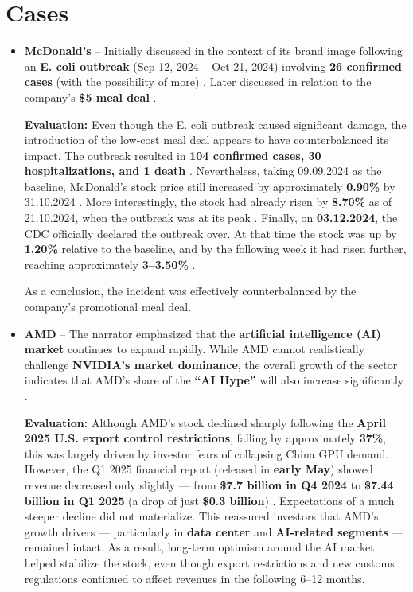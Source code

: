 \documentclass[12pt,a4paper]{article}
\begin{document}
\section{Cases}
\begin{itemize}
    \item \textbf{McDonald's} -- Initially discussed in the context of its brand image following an \textbf{E. coli outbreak} (Sep 12, 2024 – Oct 21, 2024) involving \textbf{26 confirmed cases} (with the possibility of more) \cite{wikipedia}. Later discussed in relation to the company’s \textbf{\$5 meal deal} \cite{cnbc}. 
\vspace{0.3cm}

\textbf{Evaluation:} Even though the E. coli outbreak caused significant damage, 
the introduction of the low-cost meal deal appears to have counterbalanced its impact. 
The outbreak resulted in \textbf{104 confirmed cases, 30 hospitalizations, and 1 death} \cite{wikipedia}. 
Nevertheless, taking 09.09.2024 as the baseline, McDonald’s stock price still increased by approximately \textbf{0.90\%} by 31.10.2024 \cite{yahoo}. 
More interestingly, the stock had already risen by \textbf{8.70\%} as of 21.10.2024, when the outbreak was at its peak \cite{yahoo}. 
Finally, on \textbf{03.12.2024}, the CDC officially declared the outbreak over. 
At that time the stock was up by \textbf{1.20\%} relative to the baseline, and by the following week it had risen further, reaching approximately \textbf{3--3.50\%} \cite{yahoo}.

As a conclusion, the incident was effectively counterbalanced by the company’s promotional meal deal.
\vspace{0.7cm}



    \item \textbf{AMD} -- The narrator emphasized that the \textbf{artificial intelligence (AI) market} continues to expand rapidly. 
    While AMD cannot realistically challenge \textbf{NVIDIA’s market dominance}, 
    the overall growth of the sector indicates that AMD’s share of the \textbf{“AI Hype”} will also increase significantly \cite{cnbc}.

\vspace{0.3cm}

\textbf{Evaluation:} Although AMD’s stock declined sharply following the \textbf{April 2025 U.S. export control restrictions}, 
falling by approximately \textbf{37\%}, this was largely driven by investor fears of collapsing China GPU demand. 
However, the Q1 2025 financial report (released in \textbf{early May}) showed revenue decreased only slightly --- from 
\textbf{\$7.7 billion in Q4 2024} to \textbf{\$7.44 billion in Q1 2025} (a drop of just \textbf{\$0.3 billion}) \cite{amdQ1}. 
Expectations of a much steeper decline did not materialize. This reassured investors that AMD’s growth drivers --- particularly in \textbf{data center} and \textbf{AI-related segments} --- 
remained intact. As a result, long-term optimism around the AI market helped stabilize the stock, 
even though export restrictions and new customs regulations continued to affect revenues in the following 6--12 months.
\vspace{0.7cm}



\end{itemize}
\end{document}
